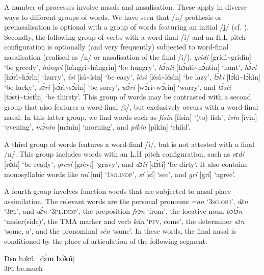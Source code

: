 A number of processes involve nasals and nasalisation. These apply in diverse ways to different groups of words. We have seen that /n/ prothesis or prenasalisation is optional with a group of words featuring an initial /j/ (cf. ). Secondly, the following group of verbs with a word-final /i/ and an H.L pitch configuration is optionally (and very frequently) subjected to word-final nasalisation (realised as /n/ or nasalisation of the final /i/): \textit{grídi} [grídì{\textasciitilde}grídìn] ‘be greedy’, \textit{hángri} [hángrì{\textasciitilde}hángrìn] ‘be hungry’, \textit{hɔ́nti} [hɔ́ntì{\textasciitilde}hɔ́ntìn] ‘hunt’, \textit{hɔ́ri} [hɔ́rì{\textasciitilde}hɔ́rìn] ‘hurry’, \textit{ísi} [ísì{\textasciitilde}ísìn] ‘be easy’, \textit{lési} [lésì{\textasciitilde}lésìn] ‘be lazy’, \textit{lɔ́ki} [lɔ́kì{\textasciitilde}lɔ́kìn] ‘be lucky’, \textit{sɔ́ri} [sɔ́rì{\textasciitilde}sɔ́rìn] ‘be sorry’, \textit{wɔ́ri} [wɔ́rì{\textasciitilde}wɔ́rìn] ‘worry’, and \textit{tɔ́sti} [tɔ́stì{\textasciitilde}tɔ́stìn] ‘be thirsty’. This group of words may be contrasted with a second group that also features a word-final /i/, but exclusively occurs with a word-final nasal. In this latter group, we find words such as \textit{físin} [físìn] ‘(to) fish’, \textit{ívin} [ívìn] ‘evening’, \textit{mɔ́nin} [mɔ́nìn] ‘morning’, and \textit{pikín} [pìkín] ‘child’.


A third group of words features a word-final /i/, but is not attested with a final /n/. This group includes words with an L.H pitch configuration, such as \textit{rɛdí} [rɛ̀dí] ‘be ready’, \textit{greví} [grèví] ‘gravy’, and \textit{dɔtí} [dɔ̀tí] ‘be dirty’. It also contains monosyllabic words like \textit{mí} [mí] ‘\textsc{1sg.indp}’, \textit{sí} [sí] ‘see’, and \textit{grí} [grí] ‘agree’. 



A fourth group involves function words that are subjected to nasal place assimilation. The relevant words are the personal pronouns \textit{=an} ‘\textsc{3sg.obj}’, \textit{dɛn} ‘\textsc{3pl}’, and \textit{dɛ́n} ‘\textsc{3pl.indp}’, the preposition \textit{frɔn} ‘from’, the locative noun{\fff} \textit{bɔtɔ́n} ‘under(side)’, the TMA marker and verb \textit{kán} ‘\textsc{pfv}, come’, the determiner \textit{sɔn} ‘some, a’, and the pronominal \textit{sén} ‘same’. In these words, the final nasal is conditioned by the place of articulation of the following segment:



\ea%
    \label{ex:key:27}
    \gll   Dɛn    bɔkú.            [dɛ̀\textbf{m}  \textbf{b}ɔ̀\textbf{\textmd{kú}}]\\
\textsc{3pl}    be.much\\

